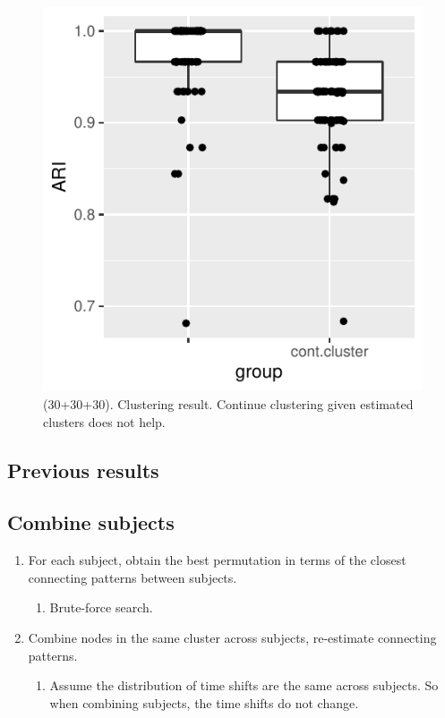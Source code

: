 \begin{figure}[H]
\includegraphics[width=.6\textwidth]{../simulation/plots/case3_cont_clus_res}
\caption{(30+30+30). Clustering result. Continue clustering given estimated clusters does not help.}
\end{figure}






\subsection{Previous results}

\subsection*{Combine subjects}
\begin{enumerate}
\item For each subject, obtain the best permutation in terms of the closest connecting patterns between subjects.
\begin{enumerate}
\item Brute-force search.
\end{enumerate}

\item Combine nodes in the same cluster across subjects, re-estimate  connecting patterns.
\begin{enumerate}
\item Assume the distribution of time shifts are the same across subjects. So when combining subjects, the time shifts do not change. 
\end{enumerate}

\end{enumerate}


